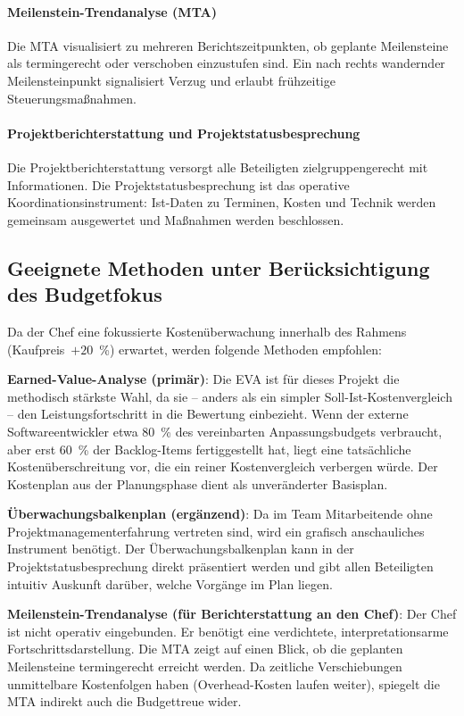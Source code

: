 \documentclass[
    a4paper,
    11pt,
    bibliography=totoc,
    listof=totoc,
    parskip=half,
    headings=normal
]{scrbook}
\begin{document}
\paragraph{Meilenstein-Trendanalyse (MTA)}
Die MTA visualisiert zu mehreren Berichtszeitpunkten, ob geplante Meilensteine
als termingerecht oder verschoben einzustufen sind. Ein nach rechts wandernder
Meilensteinpunkt signalisiert Verzug und erlaubt frühzeitige Steuerungsmaßnahmen\autocite[vgl.][Kap.~3]{Mayer2014}.

\paragraph{Projektberichterstattung und Projektstatusbesprechung}
Die Projektberichterstattung versorgt alle Beteiligten zielgruppengerecht mit
Informationen\autocite[vgl.][Kap.~3]{Mayer2014}. Die Projektstatusbesprechung
ist das operative Koordinationsinstrument: Ist-Daten zu Terminen, Kosten und
Technik werden gemeinsam ausgewertet und Maßnahmen werden beschlossen.

\subsection{Geeignete Methoden unter Berücksichtigung des Budgetfokus}

Da der Chef eine fokussierte Kostenüberwachung innerhalb des Rahmens
(Kaufpreis~$+ 20$~\%) erwartet, werden folgende Methoden empfohlen:

\textbf{Earned-Value-Analyse (primär)}: Die EVA ist für dieses Projekt die
methodisch stärkste Wahl, da sie -- anders als ein simpler Soll-Ist-Kostenvergleich
-- den Leistungsfortschritt in die Bewertung einbezieht. Wenn der externe
Softwareentwickler etwa 80~\% des vereinbarten Anpassungsbudgets verbraucht,
aber erst 60~\% der Backlog-Items fertiggestellt hat, liegt eine tatsächliche
Kostenüberschreitung vor, die ein reiner Kostenvergleich verbergen würde. Der
Kostenplan aus der Planungsphase dient als unveränderter Basisplan\autocite[vgl.][S.~4\,ff.]{FlemingKoppelman2010}.

\textbf{Überwachungsbalkenplan (ergänzend)}: Da im Team Mitarbeitende ohne
Projektmanagementerfahrung vertreten sind, wird ein grafisch anschauliches
Instrument benötigt. Der Überwachungsbalkenplan kann in der
Projektstatusbesprechung direkt präsentiert werden und gibt allen Beteiligten
intuitiv Auskunft darüber, welche Vorgänge im Plan liegen\autocite[vgl.][Kap.~3]{Mayer2014}.

\textbf{Meilenstein-Trendanalyse (für Berichterstattung an den Chef)}: Der Chef
ist nicht operativ eingebunden. Er benötigt eine verdichtete, interpretationsarme
Fortschrittsdarstellung. Die MTA zeigt auf einen Blick, ob die geplanten
Meilensteine termingerecht erreicht werden. Da zeitliche Verschiebungen
unmittelbare Kostenfolgen haben (Overhead-Kosten laufen weiter), spiegelt die
MTA indirekt auch die Budgettreue wider.
\end{document}
